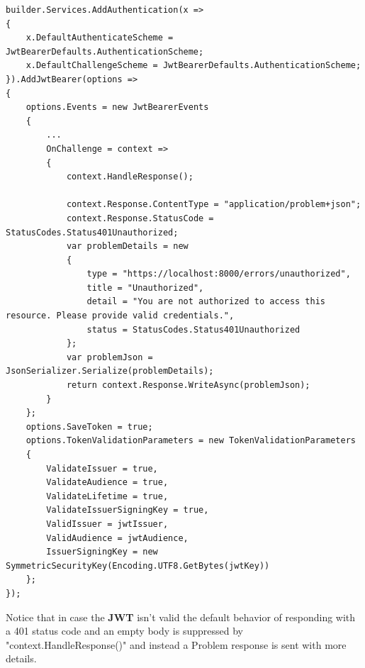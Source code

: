 \begin{lstlisting}[style=sharpc, caption={Custom JWT Authentication Middleware in ASP.NET Core: Handling Unauthorized Access with Detailed Problem Responses.}, label={authentication}] 
builder.Services.AddAuthentication(x =>
{
	x.DefaultAuthenticateScheme = JwtBearerDefaults.AuthenticationScheme;
	x.DefaultChallengeScheme = JwtBearerDefaults.AuthenticationScheme;
}).AddJwtBearer(options =>
{
	options.Events = new JwtBearerEvents
	{
		...
		OnChallenge = context =>
		{
			context.HandleResponse();
			
			context.Response.ContentType = "application/problem+json";
			context.Response.StatusCode = StatusCodes.Status401Unauthorized;
			var problemDetails = new
			{
				type = "https://localhost:8000/errors/unauthorized",
				title = "Unauthorized",
				detail = "You are not authorized to access this resource. Please provide valid credentials.",
				status = StatusCodes.Status401Unauthorized
			};
			var problemJson = JsonSerializer.Serialize(problemDetails);
			return context.Response.WriteAsync(problemJson);
		}
	};
	options.SaveToken = true;
	options.TokenValidationParameters = new TokenValidationParameters
	{
		ValidateIssuer = true,
		ValidateAudience = true,
		ValidateLifetime = true,
		ValidateIssuerSigningKey = true,
		ValidIssuer = jwtIssuer,
		ValidAudience = jwtAudience,
		IssuerSigningKey = new SymmetricSecurityKey(Encoding.UTF8.GetBytes(jwtKey))
	};
});
\end{lstlisting}

Notice that in case the \textbf{JWT} isn't valid the default behavior of responding with a 401 status code and an empty body is suppressed by "context.HandleResponse()" and instead a Problem response is sent with more details.


%
%
\newpage
